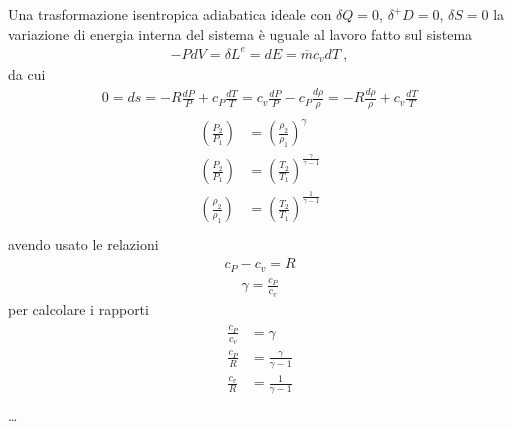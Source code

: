 \documentclass[letterpaper,10pt,italian]{jupyterBook}
\begin{document}
\sphinxAtStartPar
{} Una trasformazione isentropica \sphinxhyphen{} adiabatica ideale con \(\delta Q = 0\), \(\delta^+ D = 0\), \(\delta S = 0\) \sphinxhyphen{} la variazione di energia interna del sistema è uguale al lavoro fatto sul sistema
\begin{equation*}
\begin{split}- P dV = \delta L^e = d E = \overline{m} c_v d T \ ,\end{split}
\end{equation*}
\sphinxAtStartPar
da cui
\begin{equation*}
\begin{split}0 = ds = - R \frac{d P}{P} + c_P \frac{d T}{T} =  c_v \frac{d P}{P} - c_P \frac{d \rho}{\rho} = - R \frac{d \rho}{\rho} + c_v \frac{d T}{T} \end{split}
\end{equation*}\begin{equation*}
\begin{split}\begin{aligned}
  \left(\frac{P_2}{P_1}      \right) & = \left(\frac{\rho_2}{\rho_1} \right)^{\gamma}  \\  
  \left(\frac{P_2}{P_1}      \right) & = \left(\frac{T_2}{T_1}       \right)^{\frac{\gamma}{\gamma-1}}  \\
  \left(\frac{\rho_2}{\rho_1}\right) & = \left(\frac{T_2}{T_1}       \right)^{\frac{1}{\gamma-1}}  \\
\end{aligned}\end{split}
\end{equation*}
\sphinxAtStartPar
avendo usato le relazioni
\begin{equation*}
\begin{split}c_P - c_v = R\end{split}
\end{equation*}\begin{equation*}
\begin{split}\gamma = \frac{c_P}{c_v}\end{split}
\end{equation*}
\sphinxAtStartPar
per calcolare i rapporti
\begin{equation*}
\begin{split}\begin{aligned}
 \frac{c_P}{c_v} & = \gamma \\
 \frac{c_P}{R}   & = \frac{\gamma}{\gamma - 1} \\
 \frac{c_v}{R}   & = \frac{1}{\gamma - 1} \\
\end{aligned}\end{split}
\end{equation*}
\sphinxAtStartPar
…
\end{document}
